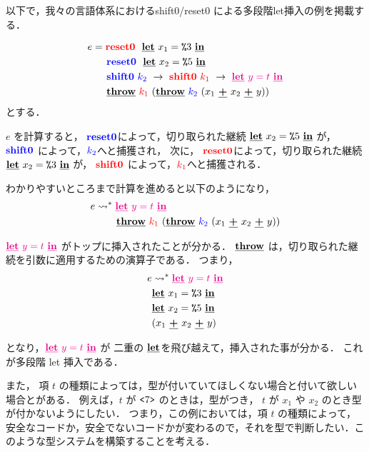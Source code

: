 以下で，我々の言語体系におけるshift0/reset0 による多段階let挿入の例を掲載する．

\begin{align*}
    e &= \red{\Resetz} ~~\cLet~x_1=\csp{3}~\cIn \\
      &\phantom{=}~~ \blue{\Resetz} ~~\cLet~x_2=\csp{5}~\cIn \\
      &\phantom{=}~~ \blue{\Shiftz}~\blue{k_2}~\to~ \red{\Shiftz}~\red{k_1}~\to~ \magenta{\cLet~y=t~\cIn} \\
      &\phantom{=}~~ \cThrow~\red{k_1}~(\cThrow~\blue{k_2}~(x_1~\cPlus~x_2~\cPlus~y))
\end{align*}
とする．

$e$ を計算すると，
$\blue{\Resetz}$によって，切り取られた継続 $\cLet~x_2=\csp{5}~\cIn$ が，
$\blue{\Shiftz}$ によって，$\blue{k_2}$へと捕獲され，
次に，
$\red{\Resetz}$によって，切り取られた継続 $\cLet~x_2=\csp{3}~\cIn$ が，
$\red{\Shiftz}$ によって，$\red{k_1}$へと捕獲される．

わかりやすいところまで計算を進めると以下のようになり，
\begin{align*}
  e & \too \magenta{\cLet~y=t~\cIn} \\
    & \phantom{\too}~~ \cThrow~\red{k_1}~(\cThrow~\blue{k_2}~(x_1~\cPlus~x_2~\cPlus~y))
\end{align*}

$\magenta{\cLet~y=t~\cIn}$ がトップに挿入されたことが分かる．
$\cThrow$ は，切り取られた継続を引数に適用するための演算子である．
つまり，
\begin{align*}
  e & \too \magenta{\cLet~y=t~\cIn} \\
    & \cLet~x_1=\csp{3}~\cIn \\
    & \cLet~x_2=\csp{5}~\cIn \\
    & (x_1~\cPlus~x_2~\cPlus~y)
\end{align*}

となり，$\magenta{\cLet~y=t~\cIn}$ が 二重の $\cLet$を飛び越えて，挿入された事が分かる．
これが多段階 let 挿入である．

また， 項 $t$ の種類によっては，型が付いていてほしくない場合と付いて欲しい場合とがある．
例えば，$t$ が $\code{7}$ のときは，型がつき，
$t$ が $x_1$ や $x_2$ のとき型が付かないようにしたい．
つまり，この例においては，項 $t$ の種類によって，安全なコードか，安全でないコードかが変わるので，それを型で判断したい．このような型システムを構築することを考える．

